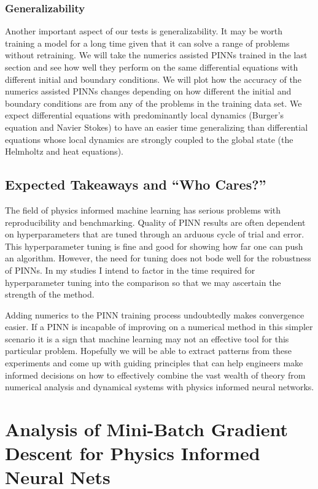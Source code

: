 \documentclass[12pt]{article}
\begin{document}
\subsubsection*{Generalizability}

Another important aspect of our tests is generalizability. It may be worth training a model for a long time given that it can solve a 
range of problems without retraining. We will take the numerics assisted PINNs trained in the last section
and see how well they perform on the same differential equations with different initial and boundary conditions. We will plot how the accuracy of
the numerics assisted PINNs changes depending on how different the initial and boundary conditions are from any of the problems in the training
data set. We expect differential equations with predominantly local dynamics (Burger's equation and Navier Stokes) to have an easier time generalizing than 
differential equations whose local dynamics are strongly coupled to the global state (the Helmholtz and heat equations).

\subsection{Expected Takeaways and ``Who Cares?''}

The field of physics informed machine learning has serious problems with reproducibility and benchmarking. 
Quality of PINN results are often dependent on hyperparameters that are tuned through an arduous cycle of trial and error.
This hyperparameter tuning is fine and good for showing how far one can push an algorithm. However, the need for tuning 
does not bode well for the robustness of PINNs. In my studies I intend to factor in the time required for hyperparameter tuning
into the comparison so that we may ascertain the strength of the method.

Adding numerics to the PINN training process undoubtedly makes convergence easier. If a PINN is incapable of improving
on a numerical method in this simpler scenario it is a sign that machine learning may not an effective tool for this particular
problem. Hopefully we will be able to extract patterns from these experiments and come up with guiding principles that can help
engineers make informed decisions on how to effectively combine the vast wealth of theory from numerical analysis 
and dynamical systems with physics informed neural networks.

\section{Analysis of Mini-Batch Gradient Descent for Physics Informed Neural Nets}
\end{document}
